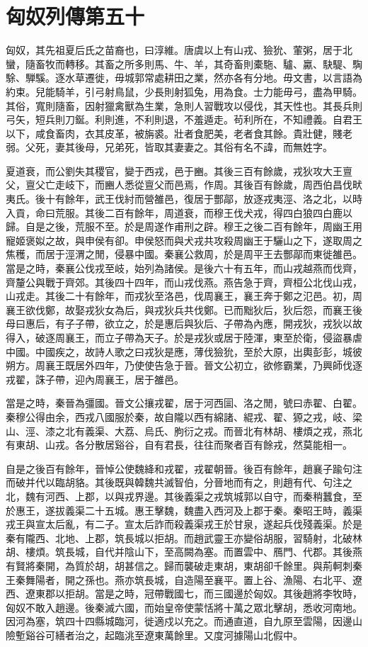 \chapter{匈奴列傳第五十}

匈奴，其先祖夏后氏之苗裔也，曰淳維。唐虞以上有山戎、獫狁、葷粥，居于北蠻，隨畜牧而轉移。其畜之所多則馬、牛、羊，其奇畜則橐駞、驢、驘、駃騠、騊駼、騨騱。逐水草遷徙，毋城郭常處耕田之業，然亦各有分地。毋文書，以言語為約束。兒能騎羊，引弓射鳥鼠，少長則射狐兔，用為食。士力能毋弓，盡為甲騎。其俗，寬則隨畜，因射獵禽獸為生業，急則人習戰攻以侵伐，其天性也。其長兵則弓矢，短兵則刀鋋。利則進，不利則退，不羞遁走。茍利所在，不知禮義。自君王以下，咸食畜肉，衣其皮革，被旃裘。壯者食肥美，老者食其餘。貴壯健，賤老弱。父死，妻其後母，兄弟死，皆取其妻妻之。其俗有名不諱，而無姓字。

夏道衰，而公劉失其稷官，變于西戎，邑于豳。其後三百有餘歲，戎狄攻大王亶父，亶父亡走岐下，而豳人悉從亶父而邑焉，作周。其後百有餘歲，周西伯昌伐畎夷氏。後十有餘年，武王伐紂而營雒邑，復居于酆鄗，放逐戎夷涇、洛之北，以時入貢，命曰荒服。其後二百有餘年，周道衰，而穆王伐犬戎，得四白狼四白鹿以歸。自是之後，荒服不至。於是周遂作甫刑之辟。穆王之後二百有餘年，周幽王用寵姬褒姒之故，與申侯有卻。申侯怒而與犬戎共攻殺周幽王于驪山之下，遂取周之焦穫，而居于涇渭之閒，侵暴中國。秦襄公救周，於是周平王去酆鄗而東徙雒邑。當是之時，秦襄公伐戎至岐，始列為諸侯。是後六十有五年，而山戎越燕而伐齊，齊釐公與戰于齊郊。其後四十四年，而山戎伐燕。燕告急于齊，齊桓公北伐山戎，山戎走。其後二十有餘年，而戎狄至洛邑，伐周襄王，襄王奔于鄭之氾邑。初，周襄王欲伐鄭，故娶戎狄女為后，與戎狄兵共伐鄭。已而黜狄后，狄后怨，而襄王後母曰惠后，有子子帶，欲立之，於是惠后與狄后、子帶為內應，開戎狄，戎狄以故得入，破逐周襄王，而立子帶為天子。於是戎狄或居于陸渾，東至於衛，侵盜暴虐中國。中國疾之，故詩人歌之曰戎狄是應，薄伐獫狁，至於大原，出輿彭彭，城彼朔方。周襄王既居外四年，乃使使告急于晉。晉文公初立，欲修霸業，乃興師伐逐戎翟，誅子帶，迎內周襄王，居于雒邑。

當是之時，秦晉為彊國。晉文公攘戎翟，居于河西圁、洛之閒，號曰赤翟、白翟。秦穆公得由余，西戎八國服於秦，故自隴以西有綿諸、緄戎、翟、獂之戎，岐、梁山、涇、漆之北有義渠、大荔、烏氏、朐衍之戎。而晉北有林胡、樓煩之戎，燕北有東胡、山戎。各分散居谿谷，自有君長，往往而聚者百有餘戎，然莫能相一。

自是之後百有餘年，晉悼公使魏絳和戎翟，戎翟朝晉。後百有餘年，趙襄子踰句注而破并代以臨胡貉。其後既與韓魏共滅智伯，分晉地而有之，則趙有代、句注之北，魏有河西、上郡，以與戎界邊。其後義渠之戎筑城郭以自守，而秦稍蠶食，至於惠王，遂拔義渠二十五城。惠王擊魏，魏盡入西河及上郡于秦。秦昭王時，義渠戎王與宣太后亂，有二子。宣太后詐而殺義渠戎王於甘泉，遂起兵伐殘義渠。於是秦有隴西、北地、上郡，筑長城以拒胡。而趙武靈王亦變俗胡服，習騎射，北破林胡、樓煩。筑長城，自代并陰山下，至高闕為塞。而置雲中、鴈門、代郡。其後燕有賢將秦開，為質於胡，胡甚信之。歸而襲破走東胡，東胡卻千餘里。與荊軻刺秦王秦舞陽者，開之孫也。燕亦筑長城，自造陽至襄平。置上谷、漁陽、右北平、遼西、遼東郡以拒胡。當是之時，冠帶戰國七，而三國邊於匈奴。其後趙將李牧時，匈奴不敢入趙邊。後秦滅六國，而始皇帝使蒙恬將十萬之眾北擊胡，悉收河南地。因河為塞，筑四十四縣城臨河，徙適戍以充之。而通直道，自九原至雲陽，因邊山險塹谿谷可繕者治之，起臨洮至遼東萬餘里。又度河據陽山北假中。

